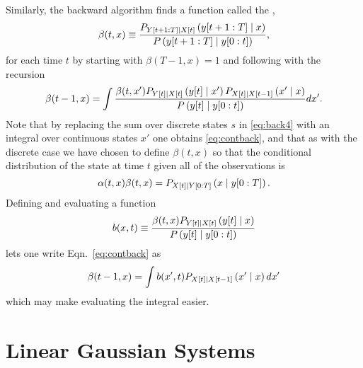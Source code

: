 Similarly, the backward algorithm finds a function called the
,
\begin{equation}
  \label{eq:contbeta}
  \beta(t,x) \equiv \frac{P_{Y[t+1:T]\mid {X}{[t]}}
  \left(y[t+1:T]\mid x \right)}{P\left(y[t+1:T]\mid y[0:t]
               \right)},
\end{equation}
for each time $t$ by starting with $\beta(T-1,x) = 1$ and following with
the recursion
\begin{equation}
  \label{eq:contback}
  \beta(t-1,x) = \int 
  \frac{\beta(t,x') P_{{Y}{[t]}\mid {X}{[t]}}\left({y}{[t]}\mid x' \right)
  P_{{X}{[t]}\mid {X}{[t-1]}}\left(x'\mid x \right)}
  {P\left({y}{[t]}\mid y[0:t] \right)} dx'.
\end{equation}
Note that by replacing the sum over discrete states $s$ in
\eqref{eq:back4} with an integral over continuous states $x'$ one
obtains \eqref{eq:contback}, and that as with the discrete case we
have chosen to define $\beta(t,x)$ so that the conditional
distribution of the state at time $t$ given all of the observations is
\begin{equation}
  \label{eq:contalphabeta}
  \alpha(t,x) \beta(t,x) = P_{{X}{[t]}\mid Y[0:T]}
  \left(x\mid y[0:T] \right).
\end{equation}
Defining and evaluating a \emph{} function
\begin{equation}
  \label{eq:bdef}
  b(x,t) \equiv \frac{\beta(t,x)
    P_{{Y}{[t]}\mid {X}{[t]}}\left({y}{[t]}\mid x
    \right)} {P\left({y}{[t]}\mid y[0:t] \right)}
\end{equation}
lets one write Eqn.~\eqref{eq:contback} as
\begin{equation*}
  \beta(t-1,x) = \int b(x',t) P_{{X}{[t]}\mid {X}{[t-1]}}\left(x'\mid x
  \right) dx'
\end{equation*}
which may make evaluating the integral easier.

\section{Linear Gaussian Systems}
\label{sec:LinearGaussian}

